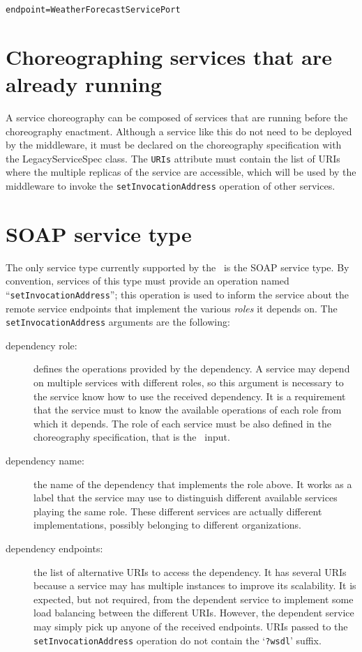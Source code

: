 {\footnotesize
\begin{lstlisting}[caption=LTS file of a simple coordination delegate that acts as a proxy, label=lst:weather_lts] 
endpoint=WeatherForecastServicePort
\end{lstlisting}
}

\section{Choreographing services that are already running}

A service choreography can be composed of services that are running before the choreography enactment. Although a service like this do not need to be deployed by the middleware, it must be declared on the choreography specification with the \textsf{LegacyServiceSpec} class. The \texttt{URIs} attribute must contain the list of URIs where the multiple replicas of the service are accessible, which will be used by the middleware to invoke the \texttt{setInvocationAddress} operation of other services. 

\section{SOAP service type}

The only service type currently supported by the \ee\ is the SOAP service type. By convention, services of this type must provide an operation named ``\texttt{setInvocationAddress}''; this operation is used to inform the service about the remote service endpoints that implement the various \emph{roles} it depends on.  The \texttt{setInvocationAddress} arguments are the following:

\begin{description}
\item [dependency role:] defines the operations provided by the dependency. A service may depend on multiple services with different roles, so this argument is necessary to the service know how to use the received dependency. It is a requirement that the service must to know the available operations of each role from which it depends. The role of each service must be also defined in the choreography specification, that is the \ee\ input.
\item [dependency name:] the name of the dependency  that implements the role above. It works as a label that the  service may use to distinguish different available services playing the same role. These different services are actually different implementations, possibly belonging to different organizations.
\item [dependency endpoints:] the list of alternative URIs to access the dependency. It has several URIs because a service may has multiple instances to improve its scalability. It is expected, but not required, from the dependent service to implement some load balancing between the different URIs. However, the dependent service may simply pick up anyone of the received endpoints. URIs passed to the \texttt{setInvocationAddress} operation do not contain the `\texttt{?wsdl}' suffix.
\end{description}

